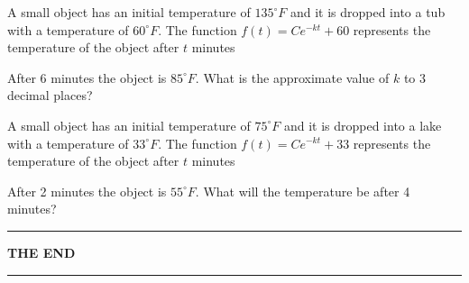 \begin{exercise}
A small object has an initial temperature of $135^\circ F$ and it is dropped into a tub with a
temperature of $60^\circ F$. The function $f(t)=Ce^{-kt}+60$ represents the temperature
of the object after $t$ minutes

\vspace{0.5em}

After 6 minutes the object is $85^\circ F$. What is the approximate value of $k$ to 3 decimal places?
\end{exercise}
\begin{solution}[4in]

\end{solution}

\begin{exercise}
A small object has an initial temperature of $75^\circ F$ and it is dropped into a lake with a
temperature of $33^\circ F$. The function $f(t)=Ce^{-kt}+33$ represents the temperature
of the object after $t$ minutes

\vspace{0.5em}

After 2 minutes the object is $55^\circ F$. What will the temperature be after 4 minutes?
\end{exercise}
\begin{solution}[4in]

\end{solution}

\hrule
\begin{center}
\textbf{\Large THE END}
\end{center}
\hrule